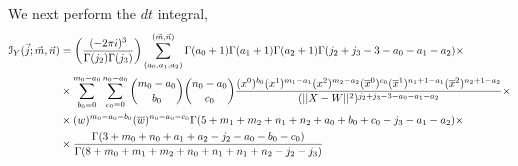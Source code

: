 \documentclass[../main.tex]{subfiles}
\begin{document}
We next perform the $dt$ integral,
\begingroup \allowdisplaybreaks \begin{align}
\mathcal{I}_Y (\vec{j};\vec{m}, \vec{n}) &= \bigg( \frac{(-2\pi i)^3}{\Gamma(j_2) \Gamma(j_3)} \bigg) \sum_{(a_0,a_1,a_2)}^{(\vec{m},\vec{n})} \Gamma(a_0+1) \Gamma(a_1+1) \Gamma(a_2+1) \Gamma(j_2+j_3-3-a_0-a_1-a_2) \times \notag \\
&\times \sum_{b_0=0}^{m_0-a_0}  \sum_{c_0=0}^{n_0-a_0} {m_0-a_0 \choose b_0} {n_0 -a_0 \choose c_0} \frac{(x^0)^{b_0} (x^1)^{m_1-a_1} (x^2)^{m_2-a_2} (\overline{x}^0)^{c_0} (\overline{x}^1)^{n_1+1-a_1} (\overline{x}^2)^{n_2+1-a_2}}{(\vert \vert X-W \vert \vert^2)^{j_2+j_3-3-a_0-a_1-a_2}} \times \notag \\
 & \times (w)^{m_0-a_0-b_0} (\overline{w})^{n_0-a_0-c_0} \Gamma(5+m_1+m_2+n_1+n_2+a_0+b_0+c_0-j_3-a_1-a_2) \times \notag \\
 & \times \frac{\Gamma(3+m_0+n_0+a_1+a_2-j_2-a_0-b_0-c_0)}{\Gamma(8+m_0+m_1+m_2+n_0+n_1+n_1+n_2-j_2-j_3)} \label{eq: I_Y}
\end{align} \endgroup
\end{document}
